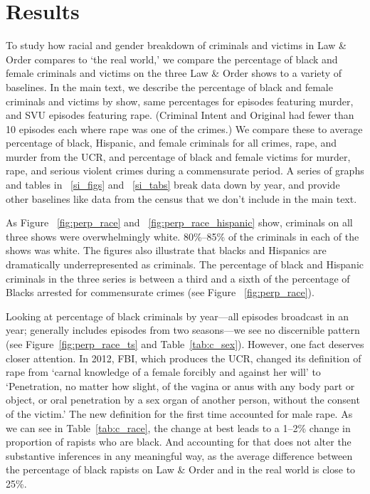 \documentclass[12pt, letterpaper]{article}
\begin{document}
\section*{Results}
To study how racial and gender breakdown of criminals and victims in Law \& Order compares to `the real world,' we compare the percentage of black and female criminals and victims on the three Law \& Order shows to a variety of baselines. In the main text, we describe the percentage of black and female criminals and victims by show, same percentages for episodes featuring murder, and SVU episodes featuring rape. (Criminal Intent and Original had fewer than 10 episodes each where rape was one of the crimes.) We compare these to average percentage of black, Hispanic, and female criminals for all crimes, rape, and murder from the UCR, and percentage of black and female victims for murder, rape, and serious violent crimes during a commensurate period. A series of graphs and tables in ~\ref{si_figs} and ~\ref{si_tabs} break data down by year, and provide other baselines like data from the census that we don't include in the main text.

As Figure ~\ref{fig:perp_race} and ~\ref{fig:perp_race_hispanic} show, criminals on all three shows were overwhelmingly white. 80\%--85\% of the criminals in each of the shows was white. The figures also illustrate that blacks and Hispanics are dramatically underrepresented as criminals. The percentage of black and Hispanic criminals in the three series is between a third and a sixth of the percentage of Blacks arrested for commensurate crimes (see Figure ~\ref{fig:perp_race}). 

Looking at percentage of black criminals by year---all episodes broadcast in an year; generally includes episodes from two seasons---we see no discernible pattern (see Figure~\ref{fig:perp_race_ts} and Table~\ref{tab:c_sex}). However, one fact deserves closer attention. In 2012, FBI, which produces the UCR, changed its definition of rape from `carnal knowledge of a female forcibly and against her will' to `Penetration, no matter how slight, of the vagina or anus with any body part or object, or oral penetration by a sex organ of another person, without the consent of the victim.' The new definition for the first time accounted for male rape. As we can see in Table~\ref{tab:c_race}, the change at best leads to a 1--2\% change in proportion of rapists who are black. And accounting for that does not alter the substantive inferences in any meaningful way, as the average difference between the percentage of black rapists on Law \& Order and in the real world is close to 25\%.
\end{document}
